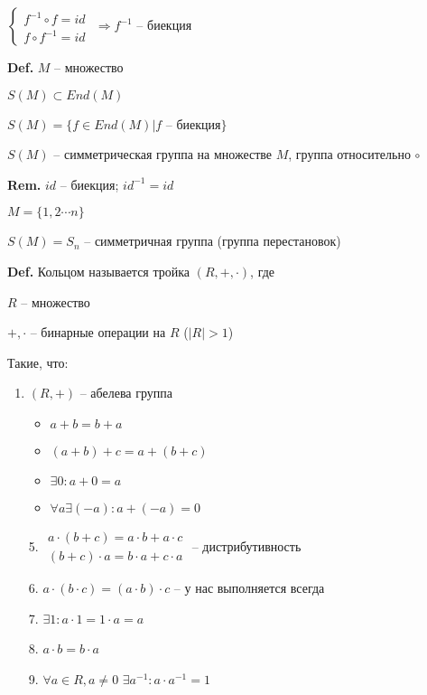 \documentclass[14pt, letter paper]{article}
\begin{document}
$\begin{cases}
f^{-1} \circ f = id \\
f \circ f^{-1} = id
\end{cases}$
$\Rightarrow f^{-1}$ -- биекция

\textbf{Def.} $M$ -- множество

$S(M) \subset End(M)$

$S(M) = \{ f \in End(M)| f$ -- биекция$\}$

$S(M)$ -- симметрическая группа на множестве $M$, группа относительно $\circ$

\textbf{Rem.} $id$ -- биекция; $id^{-1} = id$

$M = \{ 1, 2 \cdots n\}$

$S(M) = S_n$ -- симметричная группа (группа перестановок)

\textbf{Def.} Кольцом называется тройка $(R, +, \cdot)$, где

$R$ -- множество

$+, \cdot$ -- бинарные операции на $R$ ($|R| > 1$)

Такие, что:

\begin{enumerate}
    \item $(R, +)$ -- абелева группа

    \begin{itemize}
        \item $a + b = b + a$
        \item $(a + b) + c = a + (b + c)$
        \item $\exists 0: a + 0 = a$
        \item $\forall a \exists (-a) : a + (-a) = 0$
    \end{itemize}

    \item[5.] $\begin{gathered}
        a \cdot (b + c) = a \cdot b + a \cdot c \\
        (b + c) \cdot a = b \cdot a + c \cdot a
    \end{gathered}$
    -- дистрибутивность

    \item[6.] $a \cdot (b \cdot c) = (a \cdot b) \cdot c$ -- у нас выполняется всегда

    \item[7.] $\exists 1 : a \cdot 1 = 1 \cdot a = a$

    \item[8.] $a \cdot b = b \cdot a$

    \item[9.] $\forall a \in R, a \neq 0$ $\exists a^{-1} : a \cdot a^{-1} = 1$
\end{enumerate}
\end{document}
